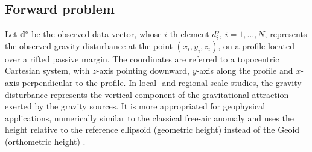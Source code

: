 \documentclass[manuscript]{geophysics}
\begin{document}
\subsection{Forward problem}


Let $\mathbf{d}^{o}$ be the observed data vector, whose $i$-th element $d^{o}_{i}$, 
$i = 1, \dots, N$, represents the observed gravity disturbance \citep{heiskanen-moritz1967} 
at the point $(x_{i}, y_{i}, z_{i})$, on a profile located over a rifted passive margin. 
The coordinates are referred to a topocentric Cartesian system, with $z$-axis pointing
downward, $y$-axis along the profile and $x$-axis perpendicular to the profile. 
In local- and regional-scale studies, the gravity disturbance 
represents the vertical component of the gravitational attraction exerted by the gravity 
sources. It is more appropriated for geophysical applications,
numerically similar to the classical free-air anomaly and uses the height relative to the
reference ellipsoid (geometric height) instead of the Geoid (orthometric height)
\citep{li2001, fairhead2003, hackney-featherstone2003, hinze2005, vajda-etal2006, 
vajda-etal2007}.
\end{document}
